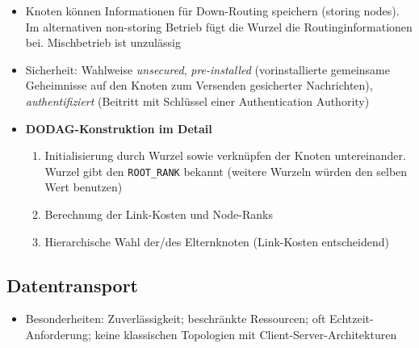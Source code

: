 \begin{itemize}
	\item Knoten können Informationen für Down-Routing speichern (storing nodes). Im alternativen non-storing Betrieb fügt die Wurzel die Routinginformationen bei. Mischbetrieb ist unzulässig
	\item Sicherheit: Wahlweise \textit{unsecured}, \textit{pre-installed} (vorinstallierte gemeinsame Geheimnisse auf den Knoten zum Versenden gesicherter Nachrichten), \textit{authentifiziert} (Beitritt mit Schlüssel einer Authentication Authority)
	\item \textbf{DODAG-Konstruktion im Detail}
	\begin{enumerate}
		\item Initialisierung durch Wurzel sowie verknüpfen der Knoten untereinander. Wurzel gibt den \texttt{ROOT\_RANK} bekannt (weitere Wurzeln würden den selben Wert benutzen)
		\item Berechnung der Link-Kosten und Node-Ranks
		\item Hierarchische Wahl der/des Elternknoten (Link-Kosten entscheidend)
	\end{enumerate}
\end{itemize}


\subsection{Datentransport}
\begin{itemize}
	\item Besonderheiten: Zuverlässigkeit; beschränkte Ressourcen; oft Echtzeit-Anforderung; keine klassischen Topologien mit Client-Server-Architekturen
\end{itemize}


